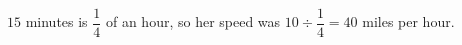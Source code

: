 $15$ minutes is $\dfrac14$ of an hour, so her speed was $10\div\dfrac14=\boxed{40}$ miles per hour.
